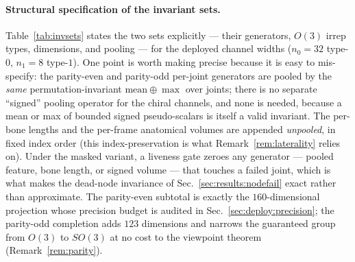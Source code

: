 \documentclass[10pt,journal]{IEEEtran}
\begin{document}
\paragraph{Structural specification of the invariant sets.} Table~\ref{tab:invsets} states the two
sets explicitly --- their generators, $O(3)$ irrep types, dimensions, and pooling --- for the
deployed channel widths ($n_0=32$ type-$0$, $n_1=8$ type-$1$). One point is worth making precise
because it is easy to mis-specify: the parity-even and parity-odd per-joint generators are pooled by
the \emph{same} permutation-invariant $\mathrm{mean}\oplus\max$ over joints; there is no separate
``signed'' pooling operator for the chiral channels, and none is needed, because a mean or max of
bounded signed pseudo-scalars is itself a valid invariant. The per-bone lengths and the per-frame
anatomical volumes are appended \emph{unpooled}, in fixed index order (this index-preservation is what
Remark~\ref{rem:laterality} relies on). Under the masked variant, a liveness gate zeroes any generator
--- pooled feature, bone length, or signed volume --- that touches a failed joint, which is what makes
the dead-node invariance of Sec.~\ref{sec:results:nodefail} exact rather than approximate. The
parity-even subtotal is exactly the $160$-dimensional projection whose precision budget is audited in
Sec.~\ref{sec:deploy:precision}; the parity-odd completion adds $123$ dimensions and narrows the
guaranteed group from $O(3)$ to $SO(3)$ at no cost to the viewpoint theorem
(Remark~\ref{rem:parity}).
\end{document}
